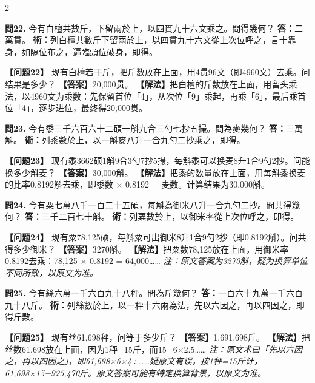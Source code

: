 \documentclass[11pt,a4paper]{article}
\begin{document}
\begin{paracol}{2}
\switchcolumn*

\textbf{問22.} 今有白檀共數斤，下留兩於上，以四貫九十六文乘之。問得幾何？\break
\textbf{答：}二萬貫。\break
\textbf{術：}列白檀共數斤下留兩於上，以四貫九十六文從上次位呼之，言十靠身，如隔位布之，遍臨頭位破身，即得。

\switchcolumn

\textbf{【问题22】} 现有白檀若干斤，把斤数放在上面，用4贯96文（即4960文）去乘。问结果是多少？\break
\textbf{【答案】}20,000贯。\break
\textbf{【解法】}把白檀的斤数放在上面，用留头乘法，以4960文为乘数：先保留首位「4」，从次位「9」乘起，再乘「6」，最后乘首位「4」，逐步进位，最终得20,000贯。

\switchcolumn*

\textbf{問23.} 今有黍三千六百六十二碩一斛九合三勺七抄五撮。問為麥幾何？\break
\textbf{答：}三萬斛。\break
\textbf{術：}列黍數於上，以一斛麥八升一合九勺二抄乘之，即得。

\switchcolumn

\textbf{【问题23】} 现有黍3662硕1斛9合3勺7抄5撮，每斛黍可以换麦8升1合9勺2抄。问能换多少斛麦？\break
\textbf{【答案】}30,000斛。\break
\textbf{【解法】}把黍的数量放在上面，用每斛黍换麦的比率0.8192斛去乘，即黍数 × 0.8192 = 麦数。计算结果为30,000斛。

\switchcolumn*

\textbf{問24.} 今有粟七萬八千一百二十五碩，每斛為御米八升一合九勺二抄。問共得幾何？\break
\textbf{答：}三千二百七十斛。\break
\textbf{術：}列粟數於上，以御米率從上次位呼之，即得。

\switchcolumn

\textbf{【问题24】} 现有粟78,125硕，每斛粟可出御米8升1合9勺2抄（即0.8192斛）。问共得多少御米？\break
\textbf{【答案】}3270斛。\break
\textbf{【解法】}把粟数78,125放在上面，用御米率0.8192去乘：78,125 × 0.8192 = 64,000……\break
\textit{注：原文答案为3270斛，疑为换算单位不同所致，以原文为准。}

\switchcolumn*

\textbf{問25.} 今有絲六萬一千六百九十八秤。問為斤幾何？\break
\textbf{答：}一百六十九萬一千六百九十八斤。\break
\textbf{術：}列絲數於上，以一秤十六兩為法，先以六因之，再以四因之，即得斤數。

\switchcolumn

\textbf{【问题25】} 现有丝61,698秤，问等于多少斤？\break
\textbf{【答案】}1,691,698斤。\break
\textbf{【解法】}把丝数61,698放在上面，因为1秤=15斤，而15=6×2.5……\break
\textit{注：原文术曰「先以六因之，再以四因之」，即61,698×6×4÷……疑原文有误，按1秤=15斤计，61,698×15=925,470斤。原文答案可能有特定换算背景，以原文为准。}


\end{paracol}
\end{document}
